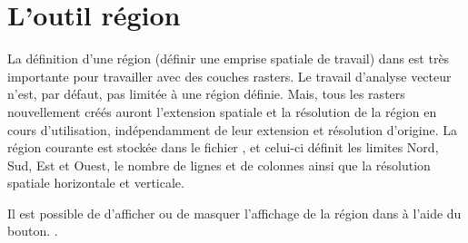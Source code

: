 \section{L'outil région \grass}\label{sec:grass_region}


La définition d'une région (définir une emprise spatiale de travail) dans \grass est très importante pour travailler avec des couches rasters. Le travail d'analyse vecteur n'est, par défaut, pas limitée à une région définie. Mais, tous les rasters nouvellement créés auront l'extension spatiale et la résolution de la région \grass en cours d'utilisation, indépendamment de leur extension et résolution d'origine. La région courante \grass est stockée dans le fichier , et celui-ci définit les limites Nord, Sud, Est et Ouest, le nombre de lignes et de colonnes ainsi que la résolution spatiale horizontale et verticale.

Il est possible de d'afficher ou de masquer l'affichage de la région \grass dans \qg à l'aide du bouton. .


